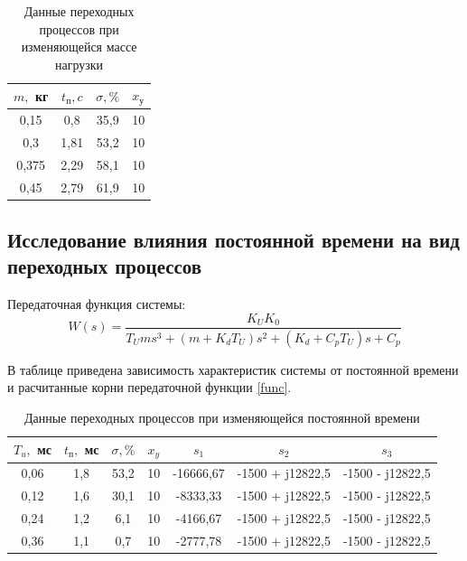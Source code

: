 \documentclass[a4paper, 12pt]{article}
\renewcommand{\arraystretch}{1.3}
\renewcommand{\tabcolsep}{0.7cm}
\begin{document}
\begin{table}[ht!]
	\centering
	\begin{threeparttable}
		\caption{Данные переходных процессов при изменяющейся массе нагрузки}
		\begin{tabular}{|c|c|c|c|}
			\hline
			$m,$ кг	& $t_\text{п}, c$	& $\sigma, \%$	& $x_\text{у}$\\\hline
			0,15	& 0,8				& 35,9			& 10\\
			\hline
			0,3		& 1,81				& 53,2			& 10\\
			\hline
			0,375	& 2,29				& 58,1			& 10\\
			\hline
			0,45	& 2,79				& 61,9			& 10\\
			\hline
		\end{tabular}
		\label{tab:x_m}
	\end{threeparttable}
\end{table}

\newpage

\begin{center}
	\section{Исследование влияния постоянной времени на вид переходных процессов}
\end{center}\par

Передаточная функция системы:\\
\begin{equation}
	W(s)=\frac{K_UK_0}{T_Ums^3+(m+K_dT_U)s^2+(K_d+C_pT_U)s+C_p}
	\label{func}
\end{equation}\par

В таблице  приведена зависимость характеристик системы от постоянной времени и расчитанные корни передаточной функции \ref{func}.  

\begin{table}[ht!]
	\centering
	\begin{threeparttable}
		\caption{Данные переходных процессов при изменяющейся постоянной времени}
		\renewcommand{\arraystretch}{1.3}
		\renewcommand{\tabcolsep}{0.45cm}
		\begin{tabular}{|c|c|c|c|c|c|c|}
			\hline
			$T_u,$ мс	& $t_\text{п},$ мс	& $\sigma, \%$	& $x_y$	& $s_1$		& $s_2$								& $s_3$								\\
			\hline
			0,06		& 1,8				& 53,2			& 10	& -16666,67	&-1500 + j12822,5	& -1500 - j12822,5\\
			\hline
			0,12		& 1,6				& 30,1			& 10	& -8333,33	&-1500 + j12822,5	& -1500 - j12822,5\\
			\hline
			0,24		& 1,2				& 6,1			& 10	& -4166,67	&-1500 + j12822,5	& -1500 - j12822,5\\
			\hline
			0,36		& 1,1				& 0,7			& 10	& -2777,78	&-1500 + j12822,5	& -1500 - j12822,5\\
			\hline
		\end{tabular}
		\label{tvarTab}
	\end{threeparttable}
\end{table}\par
\end{document}
